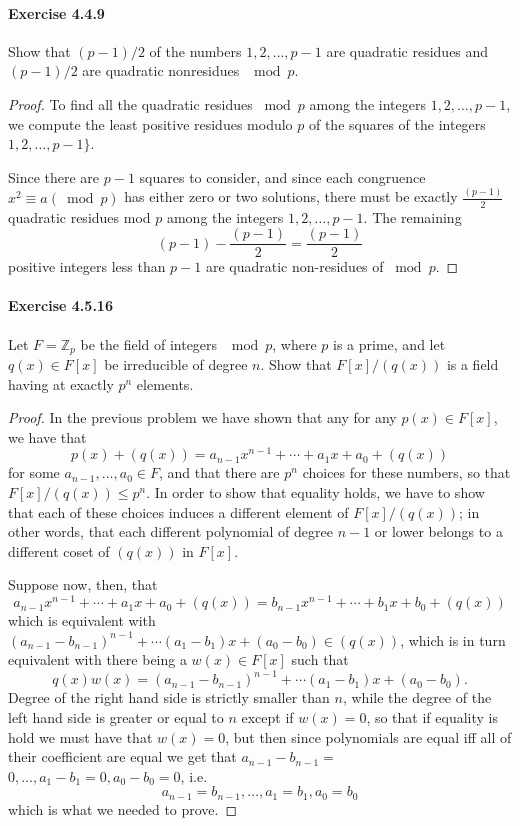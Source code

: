 \documentclass{article}
\begin{document}
\paragraph{Exercise 4.4.9} Show that $(p - 1)/2$ of the numbers $1, 2, \ldots, p - 1$ are quadratic residues and $(p - 1)/2$ are quadratic nonresidues $\mod p$.
\begin{proof}
    To find all the quadratic residues $\bmod p$ among the integers $1,2, \ldots, p-1$, we compute the least positive residues modulo $p$ of the squares of the integers $1,2, \ldots, p-1\}$.

Since there are $p-1$ squares to consider, and since each congruence $x^2 \equiv a (\bmod p)$ has either zero or two solutions, there must be exactly $\frac{(p-1)}{2}$ quadratic residues mod $p$ among the integers $1,2, \ldots, p-1$.
The remaining
$$
(p-1)-\frac{(p-1)}{2}=\frac{(p-1)}{2}
$$
positive integers less than $p-1$ are quadratic non-residues of $\bmod p$.
\end{proof}



\paragraph{Exercise 4.5.16} Let $F = \mathbb{Z}_p$ be the field of integers $\mod p$, where $p$ is a prime, and let $q(x) \in F[x]$ be irreducible of degree $n$. Show that $F[x]/(q(x))$ is a field having at exactly $p^n$ elements.
\begin{proof}
    In the previous problem we have shown that any for any $p(x) \in F[x]$, we have that
$$
p(x)+(q(x))=a_{n-1} x^{n-1}+\cdots+a_1 x+a_0+(q(x))
$$
for some $a_{n-1}, \ldots, a_0 \in F$, and that there are $p^n$ choices for these numbers, so that $F[x] /(q(x)) \leq p^n$. In order to show that equality holds, we have to show that each of these choices induces a different element of $F[x] /(q(x))$; in other words, that each different polynomial of degree $n-1$ or lower belongs to a different coset of $(q(x))$ in $F[x]$.

Suppose now, then, that
$$
a_{n-1} x^{n-1}+\cdots+a_1 x+a_0+(q(x))=b_{n-1} x^{n-1}+\cdots+b_1 x+b_0+(q(x))
$$
which is equivalent with $\left(a_{n-1}-b_{n-1}\right)^{n-1}+\cdots\left(a_1-b_1\right) x+\left(a_0-b_0\right) \in(q(x))$, which is in turn equivalent with there being a $w(x) \in F[x]$ such that
$$
q(x) w(x)=\left(a_{n-1}-b_{n-1}\right)^{n-1}+\cdots\left(a_1-b_1\right) x+\left(a_0-b_0\right) .
$$
Degree of the right hand side is strictly smaller than $n$, while the degree of the left hand side is greater or equal to $n$ except if $w(x)=0$, so that if equality is hold we must have that $w(x)=0$, but then since polynomials are equal iff all of their coefficient are equal we get that $a_{n-1}-b_{n-1}=$ $0, \ldots, a_1-b_1=0, a_0-b_0=0$, i.e.
$$
a_{n-1}=b_{n-1}, \ldots, a_1=b_1, a_0=b_0
$$
which is what we needed to prove.
\end{proof}
\end{document}
